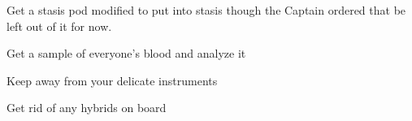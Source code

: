 \documentclass[char]{guildcamp4}
\begin{document}
\begin{itemz}[Goals]
	\item Get a stasis pod modified to put \cPlead{} into stasis though the Captain ordered that \cPlead{} be left out of it for now.
	\item Get a sample of everyone's blood and analyze it
	\item Keep \cJames{} away from your delicate instruments
	\item Get rid of any hybrids on board
\end{itemz}

\begin{contacts}
	\contact{\cVone{}} 
	\contact{\cVtwo{}}
	\contact{\cJoan{}}
	\contact{\cJulie{}}
	\contact{\cJames{}}
	\contact{\cRasputin{}}
	\contact{\cSpite{}}
	\contact{\cPlead{}}
\end{contacts}
\end{document}
